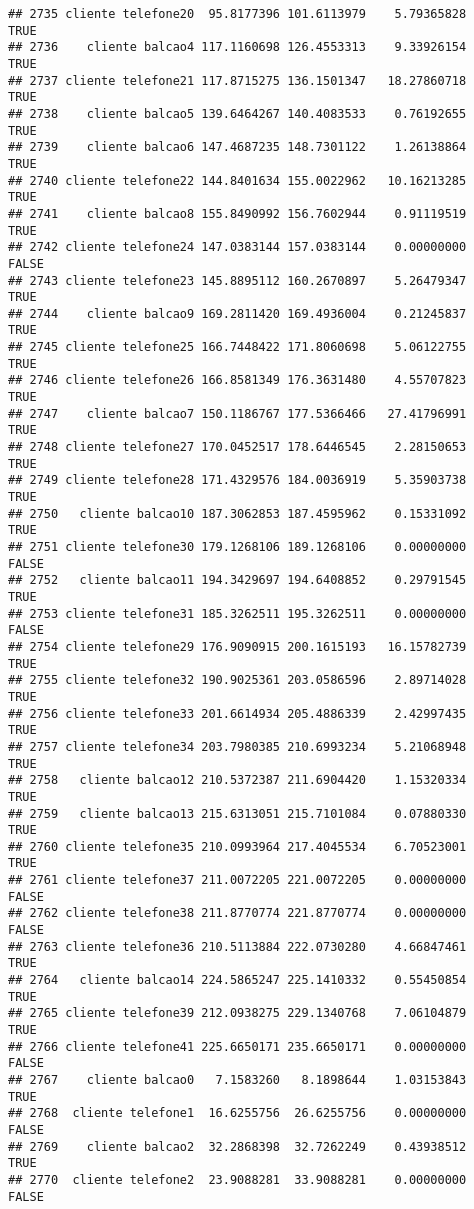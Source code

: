 \documentclass[
]{article}
\begin{document}
\begin{verbatim}
## 2735 cliente telefone20  95.8177396 101.6113979    5.79365828     TRUE
## 2736    cliente balcao4 117.1160698 126.4553313    9.33926154     TRUE
## 2737 cliente telefone21 117.8715275 136.1501347   18.27860718     TRUE
## 2738    cliente balcao5 139.6464267 140.4083533    0.76192655     TRUE
## 2739    cliente balcao6 147.4687235 148.7301122    1.26138864     TRUE
## 2740 cliente telefone22 144.8401634 155.0022962   10.16213285     TRUE
## 2741    cliente balcao8 155.8490992 156.7602944    0.91119519     TRUE
## 2742 cliente telefone24 147.0383144 157.0383144    0.00000000    FALSE
## 2743 cliente telefone23 145.8895112 160.2670897    5.26479347     TRUE
## 2744    cliente balcao9 169.2811420 169.4936004    0.21245837     TRUE
## 2745 cliente telefone25 166.7448422 171.8060698    5.06122755     TRUE
## 2746 cliente telefone26 166.8581349 176.3631480    4.55707823     TRUE
## 2747    cliente balcao7 150.1186767 177.5366466   27.41796991     TRUE
## 2748 cliente telefone27 170.0452517 178.6446545    2.28150653     TRUE
## 2749 cliente telefone28 171.4329576 184.0036919    5.35903738     TRUE
## 2750   cliente balcao10 187.3062853 187.4595962    0.15331092     TRUE
## 2751 cliente telefone30 179.1268106 189.1268106    0.00000000    FALSE
## 2752   cliente balcao11 194.3429697 194.6408852    0.29791545     TRUE
## 2753 cliente telefone31 185.3262511 195.3262511    0.00000000    FALSE
## 2754 cliente telefone29 176.9090915 200.1615193   16.15782739     TRUE
## 2755 cliente telefone32 190.9025361 203.0586596    2.89714028     TRUE
## 2756 cliente telefone33 201.6614934 205.4886339    2.42997435     TRUE
## 2757 cliente telefone34 203.7980385 210.6993234    5.21068948     TRUE
## 2758   cliente balcao12 210.5372387 211.6904420    1.15320334     TRUE
## 2759   cliente balcao13 215.6313051 215.7101084    0.07880330     TRUE
## 2760 cliente telefone35 210.0993964 217.4045534    6.70523001     TRUE
## 2761 cliente telefone37 211.0072205 221.0072205    0.00000000    FALSE
## 2762 cliente telefone38 211.8770774 221.8770774    0.00000000    FALSE
## 2763 cliente telefone36 210.5113884 222.0730280    4.66847461     TRUE
## 2764   cliente balcao14 224.5865247 225.1410332    0.55450854     TRUE
## 2765 cliente telefone39 212.0938275 229.1340768    7.06104879     TRUE
## 2766 cliente telefone41 225.6650171 235.6650171    0.00000000    FALSE
## 2767    cliente balcao0   7.1583260   8.1898644    1.03153843     TRUE
## 2768  cliente telefone1  16.6255756  26.6255756    0.00000000    FALSE
## 2769    cliente balcao2  32.2868398  32.7262249    0.43938512     TRUE
## 2770  cliente telefone2  23.9088281  33.9088281    0.00000000    FALSE

\end{verbatim}
\end{document}
